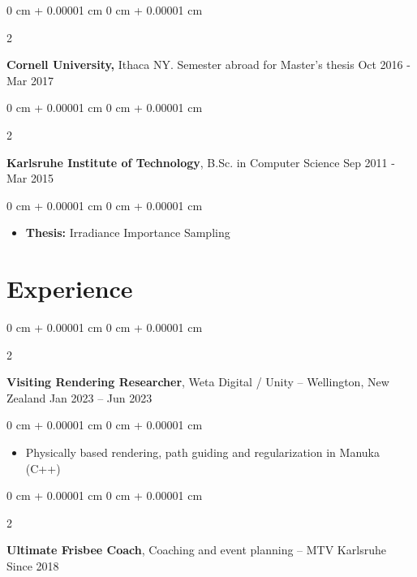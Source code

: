 \documentclass[10pt, letterpaper]{article}
\newenvironment{highlights}{
    \begin{itemize}[
        topsep=0.10 cm,
        parsep=0.10 cm,
        partopsep=0pt,
        itemsep=0pt,
        leftmargin=0 cm + 10pt
    ]
}{
    \end{itemize}
} %
\newenvironment{onecolentry}{
    \begin{adjustwidth}{
        0 cm + 0.00001 cm
    }{
        0 cm + 0.00001 cm
    }
}{
    \end{adjustwidth}
} %
\newenvironment{twocolentry}[2][]{
    \onecolentry
    \def\secondColumn{#2}
    \setcolumnwidth{\fill, 4.5 cm}
    \begin{paracol}{2}
}{
    \switchcolumn \raggedleft \secondColumn
    \end{paracol}
    \endonecolentry
} %
\begin{document}
        \educspace   
        
        \begin{twocolentry}{
            Oct 2016 - Mar 2017
        }
            \textbf{Cornell University,} Ithaca NY. Semester abroad for Master's thesis\end{twocolentry}

        \educspace

        \begin{twocolentry}{
            Sep 2011 - Mar 2015
        }
            \textbf{Karlsruhe Institute of Technology}, B.Sc. in Computer Science\end{twocolentry}

        \vspace{0.10 cm}
        \begin{onecolentry}
            \begin{highlights}
            \item \textbf{Thesis:} Irradiance Importance Sampling
            \end{highlights}
        \end{onecolentry}

    
    \sectionspace
    \section{Experience}
      \sectspacetop
        \begin{twocolentry}{
            Jan 2023 – Jun 2023
        }
            \textbf{Visiting Rendering Researcher}, Weta Digital / Unity -- Wellington, New Zealand\end{twocolentry}

        \vspace{0.10 cm}
        \begin{onecolentry}
            \begin{highlights}
                \item Physically based rendering, path guiding and regularization in Manuka (C++)
            \end{highlights}
        \end{onecolentry}

        \expspace
      
        \begin{twocolentry}{
            Since 2018
        }
            \textbf{Ultimate Frisbee Coach}, Coaching and event planning -- MTV Karlsruhe\end{twocolentry}
\end{document}
